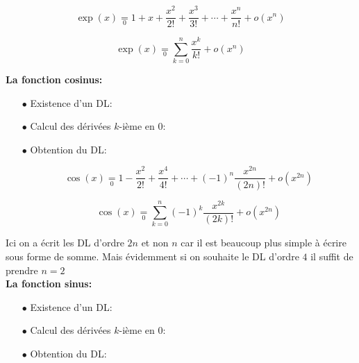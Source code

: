 \documentclass[a4paper, 11pt]{article}
\begin{document}
{\begin{itemize}
\begin{center}
\begin{dboxminipage}{0.5\textwidth}
$$\exp(x) \underset{0}{=} 1+x+\frac{x^2}{2!}+\frac{x^3}{3!}+\cdots +\frac{x^n}{n!} +o(x^n)
$$
\end{dboxminipage}
\end{center}

\begin{center}
\begin{dboxminipage}{0.5\textwidth}
$$\exp(x) \underset{0}{=} \sum_{k=0}^n \frac{x^k}{k!}+o(x^n)
$$
\end{dboxminipage}
\end{center}




 \end{itemize}
 \vsec
 
\textbf{\large{La fonction cosinus:}}\vsec
 \begin{itemize}
 \item[$\bullet$] Existence d'un DL:\dotfill
 \item[$\bullet$] Calcul des d\'eriv\'ees $k$-i\`{e}me en 0: \dotfill 
 \item[$\bullet$] Obtention du DL: \vsec\\
\begin{center}
\begin{dboxminipage}{0.5\textwidth}
$$\cos(x) \underset{0}{=} 1 -\frac{x^2}{2!}+\frac{x^4}{4!}+\cdots +(-1)^n \frac{x^{2n}}{(2n)!} +o(x^{2n})
$$
\end{dboxminipage}
\end{center}

\begin{center}
\begin{dboxminipage}{0.5\textwidth}
$$\cos(x) \underset{0}{=} \sum_{k=0}^n(-1)^k \frac{x^{2k}}{(2k)!}+o(x^{2n})
$$
\end{dboxminipage}
\end{center}
 \end{itemize}
Ici on a écrit les DL d'ordre $2n$ et non $n$ car il est beaucoup plus simple à écrire sous forme de somme. Mais évidemment si on souhaite le DL d'ordre $4$ il suffit de prendre $n=2$ \\
 
\textbf{\large{La fonction sinus:}}\vsec
 \begin{itemize}
 \item[$\bullet$] Existence d'un DL:\dotfill
 \item[$\bullet$] Calcul des d\'eriv\'ees $k$-i\`{e}me en 0: \dotfill 
 \item[$\bullet$] Obtention du DL: \vsec\\


\end{itemize}}
\end{document}
